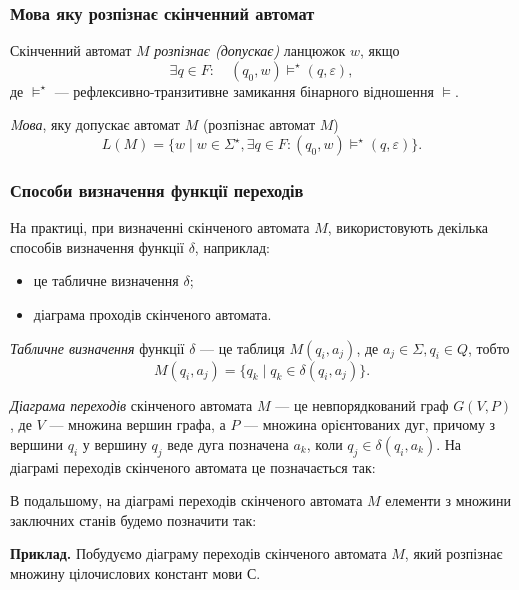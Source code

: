 \subsubsection{Мова яку розпізнає скінченний автомат}

Скінченний автомат $M$ \textit{розпізнає (допускає)} ланцюжок $w$, якщо
\[ \exists q \in F: \quad (q_0, w) \models^\star (q, \varepsilon), \]
де $\models^\star$ --- рефлексивно-транзитивне замикання бінарного відношення $\models$. \medskip

\textit{Mова}, яку допускає автомат $M$ (розпізнає автомат $M$)
\[ L(M) = \{w \mid w \in \Sigma^\star, \exists q \in F: (q_0, w) \models^\star (q, \varepsilon)\}. \]

\subsubsection{Способи визначення функції переходів}

На практиці, при визначенні скінченого автомата $M$, використовують декілька способів визначення функції $\delta$, наприклад: 
\begin{itemize}
	\item це табличне визначення $\delta$;
	\item діаграма проходів скінченого автомата.
\end{itemize}

\textit{Табличне визначення} функції $\delta$ --- це таблиця $M(q_i, a_j)$, де $a_j \in \Sigma, q_i \in Q$, тобто
\[ M(q_i, a_j) = \{ q_k \mid q_k \in \delta(q_i, a_j) \}.\]

\textit{Діаграма переходів} скінченого автомата $M$ --- це невпорядкований граф $G(V, P)$, де $V$ --- множина вершин графа, а $P$ --- множина орієнтованих дуг, причому з вершини $q_i$ у вершину $q_j$ веде дуга позначена $a_k$, коли $q_j \in \delta(q_i, a_k)$. На діаграмі переходів скінченого автомата це позначається так:
\begin{figure}[H]
	\centering
	
\end{figure}

В подальшому, на діаграмі переходів скінченого автомата $M$ елементи з множини заключних станів будемо позначити так:
\begin{figure}[H]
	\centering
	
\end{figure}

\textbf{Приклад.} Побудуємо діаграму переходів скінченого автомата $M$, який розпізнає множину цілочислових констант мови С.
\begin{figure}[H]
	\centering
	
\end{figure}

